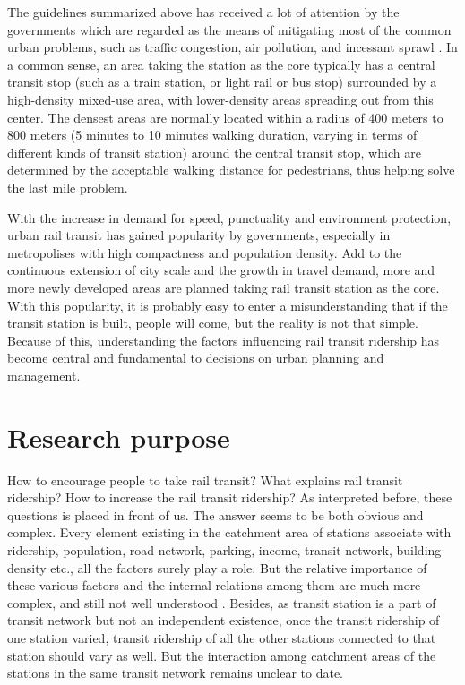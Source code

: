 The guidelines summarized above has received a lot of attention by the governments which are regarded as the means of mitigating most of the common urban problems, such as traffic congestion, air pollution, and incessant sprawl \cite{cervero2002transit}. In a common sense, an area taking the station as the core typically has a central transit stop (such as a train station, or light rail or bus stop) surrounded by a high-density mixed-use area, with lower-density areas spreading out from this center. The densest areas are normally located within a radius of 400 meters to 800 meters (5 minutes to 10 minutes walking duration, varying in terms of different kinds of transit station) around the central transit stop, which are determined by the acceptable walking distance for pedestrians, thus helping solve the last mile problem.

With the increase in demand for speed, punctuality and environment protection, urban rail transit has gained popularity by governments, especially in metropolises with high compactness and population density. Add to the continuous extension of city scale and the growth in travel demand, more and more newly developed areas are planned taking rail transit station as the core. With this popularity, it is probably easy to enter a misunderstanding that if the transit station is built, people will come, but the reality is not that simple. Because of this, understanding the factors influencing rail transit ridership has become central and fundamental to decisions on urban planning and management. 

% 
\section{Research purpose}
How to encourage people to take rail transit? What explains rail transit ridership? How to increase the rail transit ridership? As interpreted before, these questions is placed in front of us. The answer seems to be both obvious and complex. Every element existing in the catchment area of stations associate with ridership, population, road network, parking, income, transit network, building density etc., all the factors surely play a role. But the relative importance of these various factors and the internal relations among them are much more complex, and still not well understood \cite{taylor2003factors}. Besides, as transit station is a part of transit network but not an independent existence, once the transit ridership of one station varied, transit ridership of all the other stations connected to that station should vary as well. But the interaction among catchment areas of the stations in the same transit network remains unclear to date.

